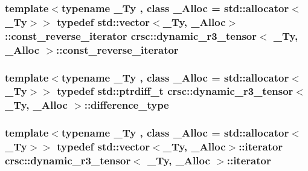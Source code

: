 \subsubsection[{\texorpdfstring{const\+\_\+reverse\+\_\+iterator}{const_reverse_iterator}}]{\setlength{\rightskip}{0pt plus 5cm}template$<$typename \+\_\+\+Ty , class \+\_\+\+Alloc  = std\+::allocator$<$\+\_\+\+Ty$>$$>$ typedef std\+::vector$<$\+\_\+\+Ty, \+\_\+\+Alloc$>$\+::{\bf const\+\_\+reverse\+\_\+iterator} {\bf crsc\+::dynamic\+\_\+r3\+\_\+tensor}$<$ \+\_\+\+Ty, \+\_\+\+Alloc $>$\+::{\bf const\+\_\+reverse\+\_\+iterator}}\hypertarget{classcrsc_1_1dynamic__r3__tensor_afed2f011951ec314926ef9368aae848a}{}\label{classcrsc_1_1dynamic__r3__tensor_afed2f011951ec314926ef9368aae848a}
\subsubsection[{\texorpdfstring{difference\+\_\+type}{difference_type}}]{\setlength{\rightskip}{0pt plus 5cm}template$<$typename \+\_\+\+Ty , class \+\_\+\+Alloc  = std\+::allocator$<$\+\_\+\+Ty$>$$>$ typedef std\+::ptrdiff\+\_\+t {\bf crsc\+::dynamic\+\_\+r3\+\_\+tensor}$<$ \+\_\+\+Ty, \+\_\+\+Alloc $>$\+::{\bf difference\+\_\+type}}\hypertarget{classcrsc_1_1dynamic__r3__tensor_a28411e1e72a5f01ff3b18f8e80d16729}{}\label{classcrsc_1_1dynamic__r3__tensor_a28411e1e72a5f01ff3b18f8e80d16729}
\subsubsection[{\texorpdfstring{iterator}{iterator}}]{\setlength{\rightskip}{0pt plus 5cm}template$<$typename \+\_\+\+Ty , class \+\_\+\+Alloc  = std\+::allocator$<$\+\_\+\+Ty$>$$>$ typedef std\+::vector$<$\+\_\+\+Ty, \+\_\+\+Alloc$>$\+::{\bf iterator} {\bf crsc\+::dynamic\+\_\+r3\+\_\+tensor}$<$ \+\_\+\+Ty, \+\_\+\+Alloc $>$\+::{\bf iterator}}\hypertarget{classcrsc_1_1dynamic__r3__tensor_a8da8f1c3ec1cde63d7693e41c9e7f496}{}\label{classcrsc_1_1dynamic__r3__tensor_a8da8f1c3ec1cde63d7693e41c9e7f496}
